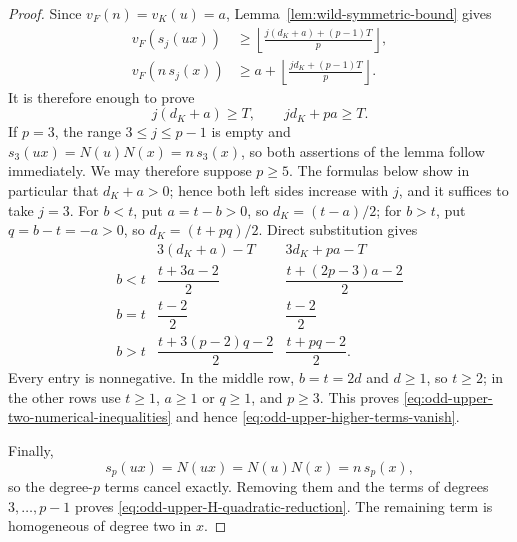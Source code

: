 \documentclass[11pt]{amsart}
\theoremstyle{definition}
\theoremstyle{remark}
\begin{document}
\begin{proof}
Since $v_F(n)=v_K(u)=a$, Lemma~\ref{lem:wild-symmetric-bound} gives
\begin{align*}
 v_F(s_j(ux))
 &\ge
 \left\lfloor
  \frac{j(d_K+a)+(p-1)T}{p}\right\rfloor,\\
 v_F(n\,s_j(x))
 &\ge a+
 \left\lfloor
  \frac{jd_K+(p-1)T}{p}\right\rfloor.
\end{align*}
It is therefore enough to prove
\begin{equation}\label{eq:odd-upper-two-numerical-inequalities}
 j(d_K+a)\ge T,
 \qquad
 jd_K+pa\ge T.
\end{equation}
If $p=3$, the range $3\le j\le p-1$ is empty and
$s_3(ux)=N(u)N(x)=n\,s_3(x)$, so both assertions of the lemma follow
immediately.  We may therefore suppose $p\ge5$.  The formulas below
show in particular that $d_K+a>0$; hence both left sides increase with
$j$, and it suffices to take $j=3$.
For $b<t$, put $a=t-b>0$, so $d_K=(t-a)/2$; for $b>t$, put
$q=b-t=-a>0$, so $d_K=(t+pq)/2$.  Direct substitution gives
\[
\begin{array}{c|c|c}
 &3(d_K+a)-T&3d_K+pa-T\\ \hline
 b<t&\dfrac{t+3a-2}{2}&\dfrac{t+(2p-3)a-2}{2}\\[2mm]
 b=t&\dfrac{t-2}{2}&\dfrac{t-2}{2}\\[2mm]
 b>t&\dfrac{t+3(p-2)q-2}{2}&\dfrac{t+pq-2}{2}.
\end{array}
\]
Every entry is nonnegative.  In the middle row, $b=t=2d$ and
$d\ge1$, so $t\ge2$; in the other rows use $t\ge1$, $a\ge1$ or
$q\ge1$, and $p\ge3$.  This proves
\eqref{eq:odd-upper-two-numerical-inequalities} and hence
\eqref{eq:odd-upper-higher-terms-vanish}.

Finally,
\[
 s_p(ux)=N(ux)=N(u)N(x)=n\,s_p(x),
\]
so the degree-$p$ terms cancel exactly.  Removing them and the terms
of degrees $3,\ldots,p-1$ proves
\eqref{eq:odd-upper-H-quadratic-reduction}.  The remaining term is
homogeneous of degree two in $x$.
\end{proof}
\end{document}
